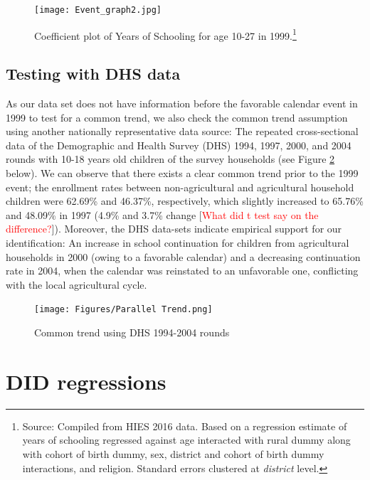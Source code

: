 \documentclass[12pt,letterpaper]{article}
\newcommand{\SAdded}[1]{\textcolor{red}{#1}}
\newcommand{\0}{\ensuremath{\mbox{\boldmath $0$}}}
\begin{document}
\begin{figure}[h!]
\centering
\texttt{[image: Event\_graph2.jpg]}\\
\caption{Coefficient plot of Years of Schooling for age 10-27 in 1999.\footnote{Source: Compiled from HIES 2016 data. Based on a regression estimate of years of schooling regressed against age interacted with rural dummy along with cohort of birth dummy, sex, district and cohort of birth dummy interactions, and religion. Standard errors clustered at \textit{district} level.}}
\label{event_graph}
\end{figure}


\subsection{Testing with DHS data\label{subsec.cohort_trend_DHS}}

As our data set does not have information before the favorable calendar event in 1999 to test for a common trend, we also check the common trend assumption using another nationally representative data source: The repeated cross-sectional data of the Demographic and Health Survey (DHS) 1994, 1997, 2000, and 2004 rounds with 10-18 years old children of the survey households (see Figure \ref{ptrendDHS} below). We can observe that there exists a clear common trend prior to the 1999 event; the enrollment rates between non-agricultural and agricultural household children were 62.69\% and 46.37\%, respectively, which slightly increased to 65.76\% and 48.09\% in 1997 (4.9\% and 3.7\% change [\SAdded{What did t test say on the difference?}]). Moreover, the DHS data-sets indicate empirical support for our identification: An increase in school continuation for children from agricultural households in 2000 (owing to a favorable calendar) and a decreasing continuation rate in 2004, when the calendar was reinstated to an unfavorable one, conflicting with the local agricultural cycle. 


\begin{figure}[h!]
\centering
\texttt{[image: Figures/Parallel Trend.png]}\\
\caption{Common trend using DHS 1994-2004 rounds}
\label{ptrendDHS}
\end{figure}




\section{DID regressions}\label{sec_DID}
\end{document}
